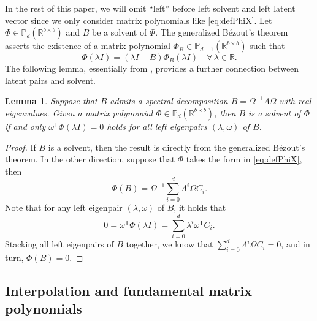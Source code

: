 \documentclass{article}
\newtheorem{lemma}{Lemma}%
\newcommand{\Ttran}{\mathsf{T}}
\newcommand{\poly}{\mathbb{P}}
\newcommand{\R}{\mathbb{R}}
\begin{document}
In the rest of this paper, we will omit ``left'' before left solvent and left latent vector since we only consider matrix polynomials like \cref{eq:defPhiX}.
Let $\Phi\in\poly_{d}(\R^{b\times b})$ and $B$ be a solvent of $\Phi$. The generalized B\'ezout's theorem \cite[Chap~4.3, Thm.~1]{Gantmacher1998} asserts the existence of a matrix polynomial $\Phi_{B}\in\poly_{d-1}(\R^{b\times b})$ such that
\begin{equation*}
    \Phi(\lambda I) = (\lambda I-B)\Phi_{B}(\lambda I) \quad \forall\, \lambda\in\R.
\end{equation*}
The following lemma, essentially from \cite[Lem.~4.1]{Dennis1976}, provides a further connection between latent pairs and solvent.

\begin{lemma}
    \label{prop:Bezout}
    Suppose that $B$ admits a spectral decomposition $B=\Omega^{-1}\Lambda\Omega$ with real eigenvalues. 
    Given a matrix polynomial $\Phi\in\poly_{d}(\R^{b\times b})$, then $B$ is a solvent of $\Phi$ if and only $\omega^{\Ttran}\Phi(\lambda I) = 0$ holds for all left eigenpairs $(\lambda,\omega)$ of $B$.
\end{lemma}
\begin{proof}
    If $B$ is a solvent, then the result is directly from the generalized B\'ezout's theorem. In the other direction, suppose that $\Phi$ takes the form in \cref{eq:defPhiX}, then
    \begin{equation*}
        \Phi(B) = \Omega^{-1}\sum_{i=0}^{d}\Lambda^{i}\Omega C_{i}.
    \end{equation*}
    Note that for any left eigenpair $(\lambda,\omega)$ of $B$, it holds that
    \begin{equation*}
        0 = \omega^{\Ttran}\Phi(\lambda I) = \sum_{i=0}^{d}\lambda^{i}\omega^{\Ttran}C_{i}.
    \end{equation*}
    Stacking all left eigenpairs of $B$ together, we know that $\sum_{i=0}^{d}\Lambda^{i}\Omega C_{i}=0$, and in turn, $\Phi(B)=0$.
\end{proof}



\subsection{Interpolation and fundamental matrix polynomials}
\end{document}
